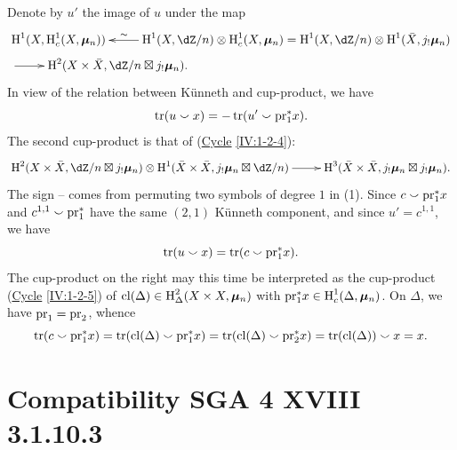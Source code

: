 Denote by $u'$ the image of $u$ under the map
\begin{align*}
&\xymatrix{
  \h^1(X,\h_c^1(X,\dmu_n))
    & \ar[l]_-\sim \h^1(X,\dZ/n) \otimes \h_c^1(X,\dmu_n) = \h^1(X,\dZ/n)\otimes \h^1(\bar X,j_!\dmu_n)
} \\
&\xymatrix{
  \ar[r]
    & \h^2(X\times \bar X,\dZ/n\boxtimes j_!\dmu_n) \text{.}
}
\end{align*}
In view of the relation between K\"unneth and cup-product, we have
\[
  \operatorname{tr}(u\smallsmile x) = -\operatorname{tr}(u'\smallsmile \mathrm{pr}_1^\ast x) \text{.}
\]
The second cup-product is that of (\hyperref[IV]{Cycle} \ref{IV:1-2-4}):
\[\xymatrix{
  \h^2(X\times \bar X,\dZ/n\boxtimes j_!\dmu_n) \otimes \h^1(\bar X\times \bar X,j_!\dmu_n\boxtimes \dZ/n) \ar[r]
    & \h^3(\bar X\times \bar X,j_!\dmu_n \boxtimes j_!\dmu_n) \text{.}
}\]
The sign -- comes from permuting two symbols of degree $1$ in
(1). Since $c\smallsmile\mathrm{pr}_1^\ast x$ and
$c^{1,1}\smallsmile \mathrm{pr}_1^\ast$ have the same $(2,1)$ K\"unneth
component, and since $u'=c^{1,1}$, we have
\[
  \operatorname{tr}(u\smallsmile x) = \operatorname{tr}(c\smallsmile \mathrm{pr}_1^\ast x) \text{.}
\]
The cup-product on the right may this time be interpreted as the
cup-product (\hyperref[IV]{Cycle} \ref{IV:1-2-5}) of
$\operatorname{cl}(\Delta)\in \operatorname{H}_\Delta^2(X\times X,{\bm\mu}_n)$ with
$\mathrm{pr}_1^\ast x\in \operatorname{H}_c^1(\Delta,{\bm\mu}_n)$. On $\Delta$, we have
$\mathrm{pr}_1=\mathrm{pr}_2$, whence
\[
  \operatorname{tr}(c\smallsmile \mathrm{pr}_1^\ast x) = \operatorname{tr}(\operatorname{cl}(\Delta)\smallsmile \mathrm{pr}_1^\ast x) = \operatorname{tr}(\operatorname{cl}(\Delta)\smallsmile \mathrm{pr}_2^\ast x) = \operatorname{tr}(\operatorname{cl}(\Delta))\smallsmile x = x \text{.}
\]









\section{Compatibility SGA 4 XVIII 3.1.10.3}\label{V:4}

